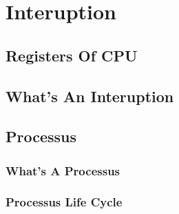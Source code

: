 \section{Interuption}

\subsection{Registers Of CPU}

\subsection{What's An Interuption}

\subsection{Processus}

\subsubsection{What's A Processus}


\subsubsection{Processus Life Cycle}



